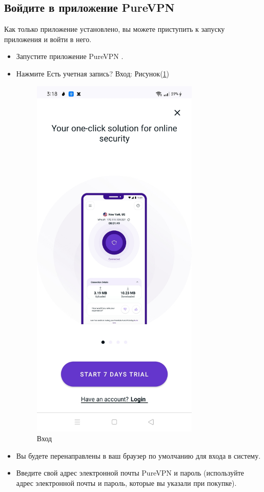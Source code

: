 \subsection{Войдите в приложение PureVPN} 
Как только приложение установлено, вы можете приступить к запуску приложения и войти в него.
\begin{itemize}
\item Запустите приложение PureVPN .
\item Нажмите Есть учетная запись? Вход:  Рисунок(\ref{fig:42})
\begin{figure}[H]
\includegraphics[width=8cm]{33.png}
\centering
\caption{Вход}
\label{fig:42}
\end{figure}
\item Вы будете перенаправлены в ваш браузер по умолчанию для входа в систему.
\item Введите свой адрес электронной почты PureVPN и пароль (используйте адрес электронной почты и пароль, которые вы указали при покупке).

\end{itemize}
